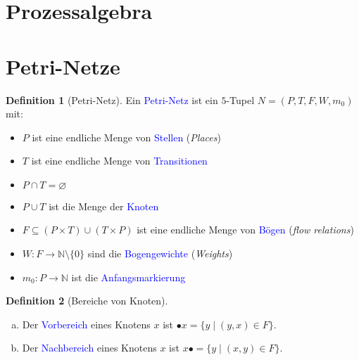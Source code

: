 \documentclass{scrreprt}
\theoremstyle{definition}
\newtheorem{Definition}{Definition}[section]
\theoremstyle{example}
\theoremstyle{algorithm}
\begin{document}
\section{Prozessalgebra}
\section{Petri-Netze}
\begin{Definition}[Petri-Netz]
Ein \textcolor{blue}{Petri-Netz} ist ein $5$-Tupel $N=(P,T,F,W,m_0)$ mit:
\begin{itemize}
\item
$P$ ist eine endliche Menge von \textcolor{blue}{Stellen} (\textit{Places})
\item
$T$ ist eine endliche Menge von \textcolor{blue}{Transitionen}
\item
$P\cap T = \varnothing$
\item
$P\cup T$ ist die Menge der \textcolor{blue}{Knoten}
\item
$F \subseteq (P\times T) \cup (T \times P)$ ist eine endliche Menge von \textcolor{blue}{Bögen} (\textit{flow relations})
\item
$W: F \rightarrow \mathbb{N} \setminus \{0\}$ sind die \textcolor{blue}{Bogengewichte} (\textit{Weights}) 
\item
$m_0: P \rightarrow \mathbb{N}$ ist die \textcolor{blue}{Anfangsmarkierung}
\end{itemize}
\end{Definition}

\begin{Definition}[Bereiche von Knoten]
\noindent
\begin{enumerate}[(a)]
\item
Der \textcolor{blue}{Vorbereich} eines Knotens $x$ ist $\bullet x = \{y \mid (y,x) \in F\}$.\item
Der \textcolor{blue}{Nachbereich} eines Knotens $x$ ist $x\bullet = \{y \mid (x,y) \in F\}$.
\end{enumerate}
\end{Definition}
\end{document}
